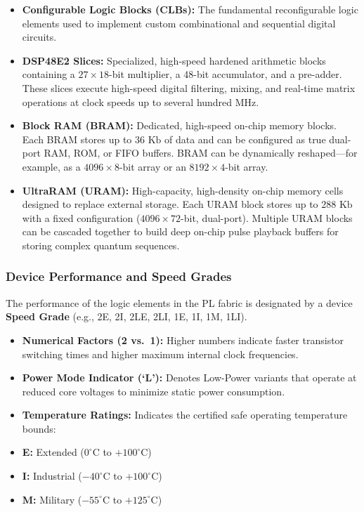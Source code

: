 \documentclass[
]{article}
\providecommand{\tightlist}{%
  \setlength{\itemsep}{0pt}\setlength{\parskip}{0pt}}
\begin{document}
\begin{itemize}
\tightlist
\item
  \textbf{Configurable Logic Blocks (CLBs):} The fundamental
  reconfigurable logic elements used to implement custom combinational
  and sequential digital circuits.
\item
  \textbf{DSP48E2 Slices:} Specialized, high-speed hardened arithmetic
  blocks containing a \(27 \times 18\)-bit multiplier, a 48-bit
  accumulator, and a pre-adder. These slices execute high-speed digital
  filtering, mixing, and real-time matrix operations at clock speeds up
  to several hundred MHz.
\item
  \textbf{Block RAM (BRAM):} Dedicated, high-speed on-chip memory
  blocks. Each BRAM stores up to \(36\text{ Kb}\) of data and can be
  configured as true dual-port RAM, ROM, or FIFO buffers. BRAM can be
  dynamically reshaped---for example, as a \(4096 \times 8\)-bit array
  or an \(8192 \times 4\)-bit array.
\item
  \textbf{UltraRAM (URAM):} High-capacity, high-density on-chip memory
  cells designed to replace external storage. Each URAM block stores up
  to \(288\text{ Kb}\) with a fixed configuration
  (\(4096 \times 72\)-bit, dual-port). Multiple URAM blocks can be
  cascaded together to build deep on-chip pulse playback buffers for
  storing complex quantum sequences.
\end{itemize}

\subsubsection{Device Performance and Speed
Grades}\label{device-performance-and-speed-grades}

The performance of the logic elements in the PL fabric is designated by
a device \textbf{Speed Grade} (e.g., 2E, 2I, 2LE, 2LI, 1E, 1I, 1M, 1LI).

\begin{itemize}
\tightlist
\item
  \textbf{Numerical Factors (2 vs.~1):} Higher numbers indicate faster
  transistor switching times and higher maximum internal clock
  frequencies.
\item
  \textbf{Power Mode Indicator (`L'):} Denotes Low-Power variants that
  operate at reduced core voltages to minimize static power consumption.
\item
  \textbf{Temperature Ratings:} Indicates the certified safe operating
  temperature bounds:
\item
  \textbf{E:} Extended (\(0^\circ\text{C}\) to \(+100^\circ\text{C}\))
\item
  \textbf{I:} Industrial (\(-40^\circ\text{C}\) to
  \(+100^\circ\text{C}\))
\item
  \textbf{M:} Military (\(-55^\circ\text{C}\) to \(+125^\circ\text{C}\))
\end{itemize}
\end{document}
